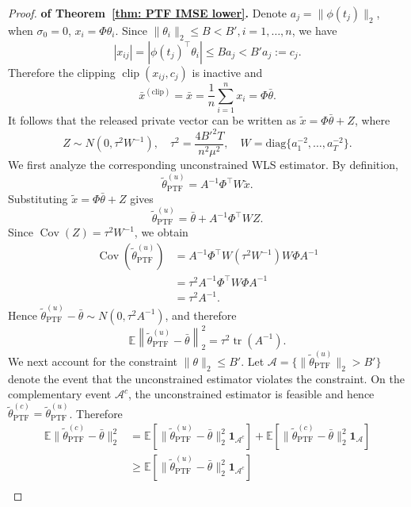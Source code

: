 \begin{proof}\textbf{of Theorem~\ref{thm: PTF IMSE lower}.}
Denote $a_j=\|\phi(t_j)\|_2$, when $\sigma_0=0$, $x_i=\Phi\theta_i$.
Since $\| \theta_i\|_2\le B<B', i=1,\ldots,n$, we have
\[
|x_{ij}|
=
|\phi(t_j)^\top\theta_i|
\leq
Ba_j
<
B'a_j:=c_j.
\]
Therefore the clipping $\operatorname{clip}(x_{ij},c_j)$ is inactive and
\[
\bar x^{(\mathrm{clip})}
=
\bar{x}
=
\dfrac{1}{n}\sum_{i=1}^n x_i
=
\Phi\bar\theta.
\]
It follows that the released private vector can be written as $\widetilde x
=
\Phi\bar\theta+Z$, where
\[
Z\sim N(0,\tau^2W^{-1}),
\quad
\tau^2=\frac{4B'^2T}{n^2\mu^2},
\quad
W = \mathrm{diag}\{a_1^{-2},\ldots,a_T^{-2}\}.
\]
We first analyze the corresponding unconstrained WLS estimator. By
definition,
\[
\widetilde\theta_{\mathrm{PTF}}^{(u)}
=
A^{-1}\Phi^\top W\widetilde x.
\]
Substituting $\widetilde x=\Phi\bar\theta+Z$ gives
\[
\widetilde\theta_{\mathrm{PTF}}^{(u)}
=
\bar\theta+
A^{-1}\Phi^\top WZ.
\]
Since $\operatorname{Cov}(Z)=\tau^2W^{-1}$, we obtain
\[
\begin{aligned}
\operatorname{Cov}
\left(
\widetilde\theta_{\mathrm{PTF}}^{(u)}
\right)
&=
A^{-1}\Phi^\top W
(\tau^2W^{-1})
W\Phi A^{-1}\\
&=
\tau^2
A^{-1}\Phi^\top W\Phi A^{-1}\\
&=
\tau^2A^{-1}.
\end{aligned}
\]
Hence $\widetilde\theta_{\mathrm{PTF}}^{(u)}-\bar\theta
\sim
N(0,\tau^2A^{-1})$, and therefore
\begin{equation}
\mathbb E
\left\|
\widetilde\theta_{\mathrm{PTF}}^{(u)}
-\bar\theta
\right\|_2^2
=
\tau^2\operatorname{tr}(A^{-1}).
\label{eq: PTF unconstrained MSE}
\end{equation}
We next account for the constraint $\|\theta\|_2\le B'$. Let $\mathcal A=\{\|\widetilde\theta_{\mathrm{PTF}}^{(u)}\|_2>B'\}$ denote the event that the unconstrained estimator violates the
constraint. On the complementary event $\mathcal A^c$, the
unconstrained estimator is feasible and hence
$\widetilde\theta_{\mathrm{PTF}}^{(c)}
=
\widetilde\theta_{\mathrm{PTF}}^{(u)}$.
Therefore
\[
\begin{aligned}
\mathbb E\|\widetilde\theta_{\mathrm{PTF}}^{(c)}-\bar\theta\|_2^2
&=
\mathbb E[
\|\widetilde\theta_{\mathrm{PTF}}^{(u)}-\bar\theta\|_2^2
\mathbf 1_{\mathcal A^c}]
+
\mathbb E[
\|\widetilde\theta_{\mathrm{PTF}}^{(c)}-\bar\theta\|_2^2
\mathbf 1_{\mathcal A}]
\\
&\geq
\mathbb E[
\|\widetilde\theta_{\mathrm{PTF}}^{(u)}-\bar\theta\|_2^2
\mathbf 1_{\mathcal A^c}]
\\

\end{aligned}\]
\end{proof}
